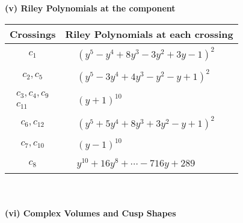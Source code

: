 \documentclass[1p]{elsarticle_modified}
\theoremstyle{definition}
\begin{document}
\newpage\renewcommand{\arraystretch}{1}
\flushleft \textbf{(v) Riley Polynomials at the component}\newline \\
\begin{tabular}{m{50pt}|m{274pt}}
Crossings & \hspace{64pt}Riley Polynomials at each crossing \\
\hline $$\begin{aligned}c_{1}\end{aligned}$$&$\begin{aligned}
&(y^5- y^4+8 y^3-3 y^2+3 y-1)^2
\end{aligned}$\\
\hline $$\begin{aligned}c_{2},c_{5}\end{aligned}$$&$\begin{aligned}
&(y^5-3 y^4+4 y^3- y^2- y+1)^2
\end{aligned}$\\
\hline $$\begin{aligned}c_{3},c_{4},c_{9}\\c_{11}\end{aligned}$$&$\begin{aligned}
&(y+1)^{10}
\end{aligned}$\\
\hline $$\begin{aligned}c_{6},c_{12}\end{aligned}$$&$\begin{aligned}
&(y^5+5 y^4+8 y^3+3 y^2- y+1)^2
\end{aligned}$\\
\hline $$\begin{aligned}c_{7},c_{10}\end{aligned}$$&$\begin{aligned}
&(y-1)^{10}
\end{aligned}$\\
\hline $$\begin{aligned}c_{8}\end{aligned}$$&$\begin{aligned}
&y^{10}+16 y^8+\cdots-716 y+289
\end{aligned}$\\
\hline
\end{tabular}\\~\\
\newpage\flushleft \textbf{(vi) Complex Volumes and Cusp Shapes}
\end{document}
